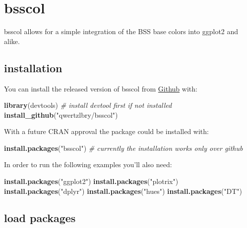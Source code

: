 \documentclass[
]{article}
\author{}
\date{\vspace{-2.5em}}
\newenvironment{Shaded}{\begin{snugshade}}{\end{snugshade}}
\newcommand{\CommentTok}[1]{\textcolor[rgb]{0.56,0.35,0.01}{\textit{#1}}}
\newcommand{\KeywordTok}[1]{\textcolor[rgb]{0.13,0.29,0.53}{\textbf{#1}}}
\newcommand{\NormalTok}[1]{#1}
\newcommand{\StringTok}[1]{\textcolor[rgb]{0.31,0.60,0.02}{#1}}
\begin{document}
\hypertarget{bsscol}{%
\section{bsscol}\label{bsscol}}

bsscol allows for a simple integration of the BSS base colors into
ggplot2 and alike.

\hypertarget{installation}{%
\subsection{installation}\label{installation}}

You can install the released version of bsscol from
\href{https://github.com/qwertzlbry/bsscol}{Github} with:

\begin{Shaded}
\begin{Highlighting}[]
\KeywordTok{library}\NormalTok{(devtools) }\CommentTok{\# install devtool first if not installed}
\KeywordTok{install\_github}\NormalTok{(}\StringTok{"qwertzlbry/bsscol"}\NormalTok{)}
\end{Highlighting}
\end{Shaded}

With a future CRAN approval the package could be installed with:

\begin{Shaded}
\begin{Highlighting}[]
\KeywordTok{install.packages}\NormalTok{(}\StringTok{"bsscol"}\NormalTok{) }\CommentTok{\# currently the installation works only over github}
\end{Highlighting}
\end{Shaded}

In order to run the following examples you'll also need:

\begin{Shaded}
\begin{Highlighting}[]
\KeywordTok{install.packages}\NormalTok{(}\StringTok{"ggplot2"}\NormalTok{)}
\KeywordTok{install.packages}\NormalTok{(}\StringTok{"plotrix"}\NormalTok{)}
\KeywordTok{install.packages}\NormalTok{(}\StringTok{"dplyr"}\NormalTok{)}
\KeywordTok{install.packages}\NormalTok{(}\StringTok{"hues"}\NormalTok{)}
\KeywordTok{install.packages}\NormalTok{(}\StringTok{"DT"}\NormalTok{)}
\end{Highlighting}
\end{Shaded}

\hypertarget{load-packages}{%
\subsection{load packages}\label{load-packages}}
\end{document}
